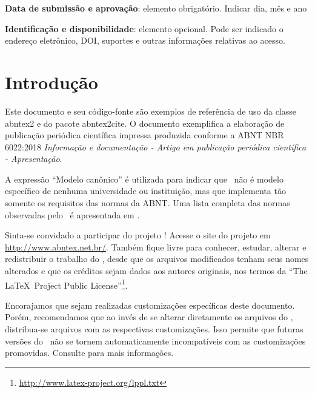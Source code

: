 \documentclass[
	article,			%
	11pt,				%
	oneside,			%
	a4paper,			%
	english,			%
	brazil,				%
	sumario=tradicional
	]{abntex2}
\begin{document}

\begin{center}\smaller
   \textbf{Data de submissão e aprovação}: elemento obrigatório. Indicar dia, mês e ano

   \textbf{Identificação e disponibilidade}: elemento opcional. Pode ser indicado
   o endereço eletrônico, DOI, suportes e outras informações relativas ao acesso.
\end{center}

\textual

\section{Introdução}

Este documento e seu código-fonte são exemplos de referência de uso da classe
\textsf{abntex2} e do pacote \textsf{abntex2cite}. O documento exemplifica a
elaboração de publicação periódica científica impressa produzida conforme a ABNT
NBR 6022:2018 \emph{Informação e documentação - Artigo em publicação periódica
   científica - Apresentação}.

A expressão ``Modelo canônico'' é utilizada para indicar que \abnTeX\ não é
modelo específico de nenhuma universidade ou instituição, mas que implementa tão
somente os requisitos das normas da ABNT. Uma lista completa das normas
observadas pelo \abnTeX\ é apresentada em .

Sinta-se convidado a participar do projeto \abnTeX! Acesse o site do projeto em
\url{http://www.abntex.net.br/}. Também fique livre para conhecer,
estudar, alterar e redistribuir o trabalho do \abnTeX, desde que os arquivos
modificados tenham seus nomes alterados e que os créditos sejam dados aos
autores originais, nos termos da ``The \LaTeX\ Project Public
License''\footnote{\url{http://www.latex-project.org/lppl.txt}}.

Encorajamos que sejam realizadas customizações específicas deste documento.
Porém, recomendamos que ao invés de se alterar diretamente os arquivos do
\abnTeX, distribua-se arquivos com as respectivas customizações. Isso permite
que futuras versões do \abnTeX~não se tornem automaticamente incompatíveis com
as customizações promovidas. Consulte 
para mais informações.
\end{document}
